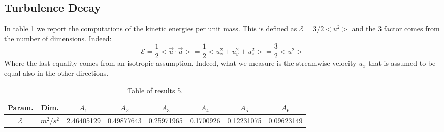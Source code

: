 \documentclass[11pt,titlepage]{article}
\begin{document}
\subsection{Turbulence Decay} \label{turbulence_decay}
In table \ref{tab5} we report the computations of the kinetic energies per unit mass. This is defined as $\mathcal{E} = 3/2<u^2>$ and the $3$ factor comes from the number of dimensions. Indeed: 
\begin{equation*}
	\mathcal{E} = \frac{1}{2} < \vec{u} \cdot \vec{u} >= \frac{1}{2} < u_x^2 + u_y^2 + u_z^2 > = \frac{3}{2} <u^2>
\end{equation*}
Where the last equality comes from an isotropic assumption. Indeed, what we measure is the streamwise velocity $u_x$ that is assumed to be equal also in the other directions.
\begin{table}[h!]
\centering
\caption{Table of results 5.} \label{tab5}
    \begin{tabular}{ | c | c | c | c | c | c | c | c |}
        \hline
        Param. & Dim. & $A_1$ & $A_2$ & $A_3$ & $A_4$ & $A_5$ & $A_6$ \\
        \hline
        $\mathcal{E}$&$m^2/s^2$ &2.46405129& 0.49877643& 0.25971965& 0.1700926 & 0.12231075 &0.09623149  \\
        \hline
    \end{tabular}
\end{table}
\end{document}
